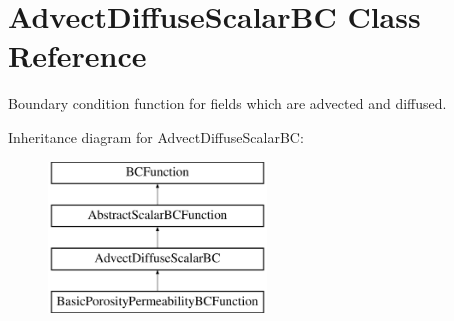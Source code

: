 \hypertarget{class_advect_diffuse_scalar_b_c}{}\section{Advect\+Diffuse\+Scalar\+BC Class Reference}
\label{class_advect_diffuse_scalar_b_c}


Boundary condition function for fields which are advected and diffused.  


Inheritance diagram for Advect\+Diffuse\+Scalar\+BC\+:\begin{figure}[H]
\begin{center}
\leavevmode
\includegraphics[height=4.000000cm]{class_advect_diffuse_scalar_b_c}
\end{center}
\end{figure}
